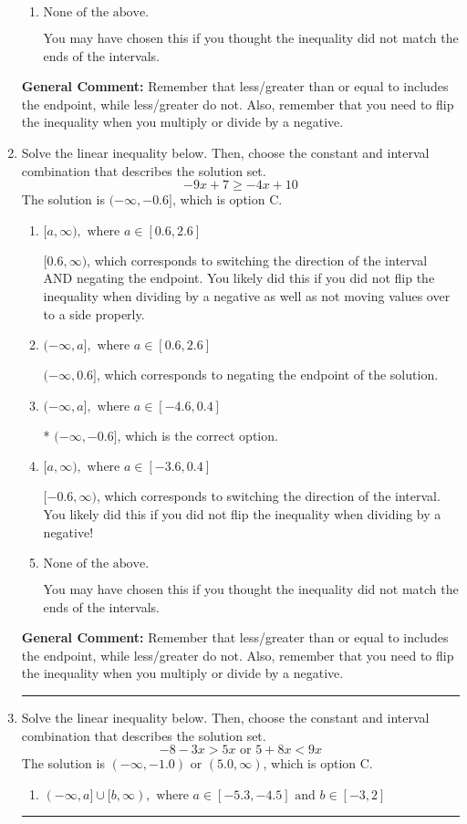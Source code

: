 \documentclass{extbook}[14pt]
\newcommand{\litem}[1]{\item #1

\rule{\textwidth}{0.4pt}}
\begin{document}
\begin{enumerate}
{\begin{enumerate}[label=\Alph*.]
 $[0.467, \infty)$, which corresponds to switching the direction of the interval. You likely did this if you did not flip the inequality when dividing by a negative!
\item \( \text{None of the above}. \)

You may have chosen this if you thought the inequality did not match the ends of the intervals.
\end{enumerate}

\textbf{General Comment:} Remember that less/greater than or equal to includes the endpoint, while less/greater do not. Also, remember that you need to flip the inequality when you multiply or divide by a negative.
}
\litem{
Solve the linear inequality below. Then, choose the constant and interval combination that describes the solution set.
\[ -9x + 7 \geq -4x + 10 \]
The solution is \( (-\infty, -0.6] \), which is option C.\begin{enumerate}[label=\Alph*.]
\item \( [a, \infty), \text{ where } a \in [0.6, 2.6] \)

 $[0.6, \infty)$, which corresponds to switching the direction of the interval AND negating the endpoint. You likely did this if you did not flip the inequality when dividing by a negative as well as not moving values over to a side properly.
\item \( (-\infty, a], \text{ where } a \in [0.6, 2.6] \)

 $(-\infty, 0.6]$, which corresponds to negating the endpoint of the solution.
\item \( (-\infty, a], \text{ where } a \in [-4.6, 0.4] \)

* $(-\infty, -0.6]$, which is the correct option.
\item \( [a, \infty), \text{ where } a \in [-3.6, 0.4] \)

 $[-0.6, \infty)$, which corresponds to switching the direction of the interval. You likely did this if you did not flip the inequality when dividing by a negative!
\item \( \text{None of the above}. \)

You may have chosen this if you thought the inequality did not match the ends of the intervals.
\end{enumerate}

\textbf{General Comment:} Remember that less/greater than or equal to includes the endpoint, while less/greater do not. Also, remember that you need to flip the inequality when you multiply or divide by a negative.
}
\litem{
Solve the linear inequality below. Then, choose the constant and interval combination that describes the solution set.
\[ -8 - 3 x > 5 x \text{ or } 5 + 8 x < 9 x \]
The solution is \( (-\infty, -1.0) \text{ or } (5.0, \infty) \), which is option C.\begin{enumerate}[label=\Alph*.]
\item \( (-\infty, a] \cup [b, \infty), \text{ where } a \in [-5.3, -4.5] \text{ and } b \in [-3, 2] \)


\end{enumerate}}
\end{enumerate}
\end{document}

